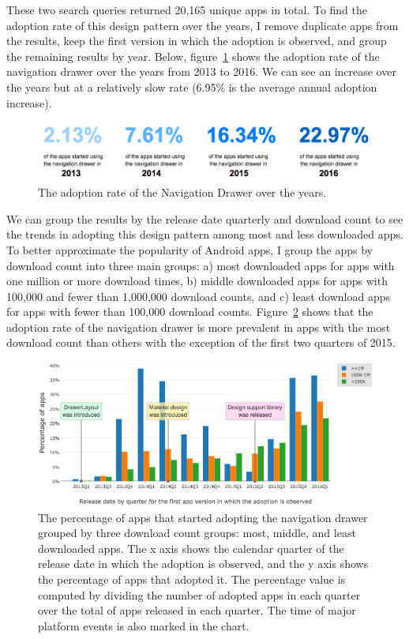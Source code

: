 \noindent These two search queries returned 20,165 unique apps in total.
To find the adoption rate of this design pattern over the years, I remove duplicate apps from the results, keep the first version in which the adoption is observed, and group the remaining results by year.
Below, figure~\ref{fig:navdrawer_years} shows the adoption rate of the navigation drawer over the years from 2013 to 2016.
We can see an increase over the years but at a relatively slow rate (6.95\% is the average annual adoption increase).
\begin{figure}[h]
	\includegraphics[scale=0.55]{figures/findings/navdrawer_over_years.png}
	\caption{The adoption rate of the Navigation Drawer over the years.}
	\label{fig:navdrawer_years}
\end{figure}
We can group the results by the release date quarterly and download count to see the trends in adopting this design pattern among most and less downloaded apps.
To better approximate the popularity of Android apps, I group the apps by download count into three main groups: a) most downloaded apps for apps with one million or more download times, b) middle downloaded apps for apps with 100,000 and fewer than 1,000,000 download counts, and c) least download apps for apps with fewer than 100,000 download counts.
Figure~\ref{fig:navdrawer_quarter_download} shows that the adoption rate of the navigation drawer is more prevalent in apps with the most download count than others with the exception of the first two quarters of 2015.
\begin{figure}[h]
	\includegraphics[scale=0.5]{figures/findings/navdrawer_by_quarter_grouped_by_downloads.png}
	\caption{The percentage of apps that started adopting the navigation drawer grouped by three download count groups: most, middle, and least downloaded apps. The x axis shows the calendar quarter of the release date in which the adoption is observed, and the y axis shows the percentage of apps that adopted it. The percentage value is computed by dividing the number of adopted apps in each quarter over the total of apps released in each quarter. The time of major platform events is also marked in the chart.}
	\label{fig:navdrawer_quarter_download}
\end{figure}

